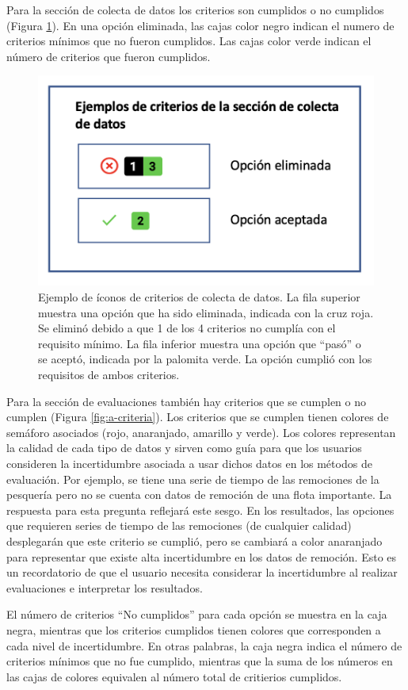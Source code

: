 \documentclass[
  11pt,
]{book}
\begin{document}
Para la sección de colecta de datos los criterios son cumplidos o no cumplidos (Figura \ref{fig:dc-criteria}). En una opción eliminada, las cajas color negro indican el numero de criterios mínimos que no fueron cumplidos. Las cajas color verde indican el número de criterios que fueron cumplidos.

\begin{figure}

{\centering \includegraphics[width=0.35\linewidth]{images/dc-criteria-es} 

}

\caption{Ejemplo de íconos de criterios de colecta de datos. La fila superior muestra una opción que ha sido eliminada, indicada con la cruz roja. Se eliminó debido a que 1 de los 4 criterios no cumplía con el requisito mínimo. La fila inferior muestra una opción que “pasó” o se aceptó, indicada por la palomita verde. La opción cumplió con los requisitos de ambos criterios.}\label{fig:dc-criteria}
\end{figure}

Para la sección de evaluaciones también hay criterios que se cumplen o no cumplen (Figura \ref{fig:a-criteria}). Los criterios que se cumplen tienen colores de semáforo asociados (rojo, anaranjado, amarillo y verde). Los colores representan la calidad de cada tipo de datos y sirven como guía para que los usuarios consideren la incertidumbre asociada a usar dichos datos en los métodos de evaluación. Por ejemplo, se tiene una serie de tiempo de las remociones de la pesquería pero no se cuenta con datos de remoción de una flota importante. La respuesta para esta pregunta reflejará este sesgo. En los resultados, las opciones que requieren series de tiempo de las remociones (de cualquier calidad) desplegarán que este criterio se cumplió, pero se cambiará a color anaranjado para representar que existe alta incertidumbre en los datos de remoción. Esto es un recordatorio de que el usuario necesita considerar la incertidumbre al realizar evaluaciones e interpretar los resultados.

El número de criterios ``No cumplidos'' para cada opción se muestra en la caja negra, mientras que los criterios cumplidos tienen colores que corresponden a cada nivel de incertidumbre. En otras palabras, la caja negra indica el número de criterios mínimos que no fue cumplido, mientras que la suma de los números en las cajas de colores equivalen al número total de critierios cumplidos.
\end{document}
